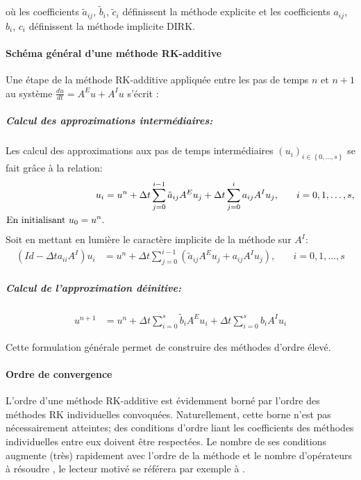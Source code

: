         où les coefficients $\tilde{a}_{ij}$, $\tilde{b}_i$, $\tilde{c}_i$ définissent la méthode explicite et 
        les coefficients $a_{ij}$, $b_i$, $c_i$ définissent la méthode implicite DIRK. 
        
    \paragraph{Schéma général d'une méthode RK-additive}
        Une étape de la méthode RK-additive appliquée entre les pas de temps $n$ et $n+1$ au système 
        $\frac{du}{dt} = A^E u + A^I u$ s'écrit :
        
        \subparagraph{Calcul des approximations intermédiaires:}
        Les calcul des approximations aux pas de temps intermédiaires $\left( u_i\right)_{i \in \left\{ 0,\ldots,s \right\}}$ 
        se fait grâce à la relation:
        \begin{align}
        u_i &= u^n + \Delta t \sum_{j=0}^{i-1} \tilde{a}_{ij} A^E u_j + \Delta t \sum_{j=0}^{i} a_{ij} A^I u_j, \quad &i = 0, 1, \ldots, s,\\\notag
        \text{En initialisant $u_0 = u^n$.}
        \end{align}
        Soit en mettant en lumière le caractère implicite de la méthode sur $A^I$:
        \begin{align}
        (Id - \Delta t a_{ii} A^I) u_i &= u^n + \Delta t \sum_{j=0}^{i-1} \left(\tilde{a}_{ij} A^E u_j + a_{ij} A^I u_j\right), \quad &i= 0, 1, \ldots, s
        \end{align}
        
        \subparagraph{Calcul de l'approximation déinitive:}
        \begin{align}
        u^{n+1} &= u^n + \Delta t \sum_{i=0}^{s} \tilde{b}_i A^E u_i + \Delta t \sum_{i=0}^{s} b_i A^I u_i
        \end{align}
        
        Cette formulation générale permet de construire des méthodes d'ordre élevé. 
    \paragraph{Ordre de convergence}
        L'ordre d'une méthode RK-additive est évidemment borné par l'ordre des méthodes RK individuelles convoquées.
        Naturellement, cette borne n'est pas nécessairement atteintes; des conditions d'ordre liant
        les coefficients des méthodes individuelles entre eux doivent être respectées. Le nombre de ses conditions augmente (très) rapidement avec 
        l'ordre de la méthode et le nombre d'opérateurs à résoudre \cite{KENNEDY2003139}, le lecteur motivé se référera par exemple à \cite{Hairer1981}.